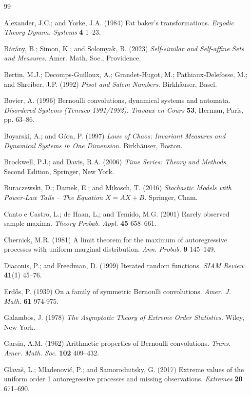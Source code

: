 \documentclass[12pt]{amsart}
\theoremstyle{definition}
\theoremstyle{remark}
\numberwithin{equation}{section}
\begin{document}
\begin{thebibliography}{99}

 Alexander, J.C.; and Yorke, J.A. (1984) Fat baker's transformations. {\it Ergodic Theory Dynam. Systems} {\bf 4} 1--23.

 B\'ar\'any, B.; Simon, K.; and Solomyak, B. (2023) {\it Self-similar and Self-affine Sets and Measures.} Amer. Math. Soc., Providence.

 Bertin, M.J.; Decomps-Guilloux, A.; Grandet-Hugot, M.; Pathiaux-Delefosse, M.; and Shreiber, J.P. (1992) {\it Pisot and Salem Numbers.} Birkh\"auser, Basel.

 Bovier, A. (1996) Bernoulli convolutions, dynamical systems and automata. {\it Disordered Systems (Temuco 1991/1992). Travaux en Cours} {\bf 53}, Herman, Paris, pp. 63--86.

 Boyarski, A.; and G\'ora, P. (1997) {\it Laws of Chaos: Invariant Measures and Dynamical Systems in One Dimension.} Birkh\"auser, Boston.

 Brockwell, P.J.; and Davis, R.A. (2006) {\it Time Series: Theory and Methods.} Second Edition, Springer, New York.

 Buraczewski, D.; Damek, E.; and Mikosch, T. (2016) {\it Stochastic Models with Power-Law Tails -- The Equation $X=AX+B$.} Springer, Cham.

 Canto e Castro, L.; de Haan, L,; and Temido, M.G. (2001) Rarely observed sample maxima. {\it Theory Probab. Appl.} {\bf 45} 658--661.

 Chernick, M.R. (1981) A limit theorem for the maximum of autoregressive processes with uniform marginal distribution. {\it Ann. Probab.} {\bf 9} 145--149.

 Diaconis, P.; and Freedman, D. (1999) Iterated random functions. {\it SIAM Review} {\bf 41}(1) 45--76.

 Erd\H{o}s, P. (1939) On a family of symmetric Bernoulli convolutions. {\it Amer. J. Math.} {\bf 61} 974-975.

 Galambos, J. (1978) {\it The Asymptotic Theory of Extreme Order Statistics.} Wiley, New York.

 Garsia, A.M. (1962) Arithmetic properties of Bernoulli convolutions. {\it Trans. Amer. Math. Soc.} {\bf 102} 409--432.

 Glava\v{s}, L.; Mladenovi\'c, P.; and Samorodnitsky, G. (2017) Extreme values of the uniform order 1 autoregressive processes and missing observations. {\it Extremes} {\bf 20} 671--690.


\end{thebibliography}
\end{document}
